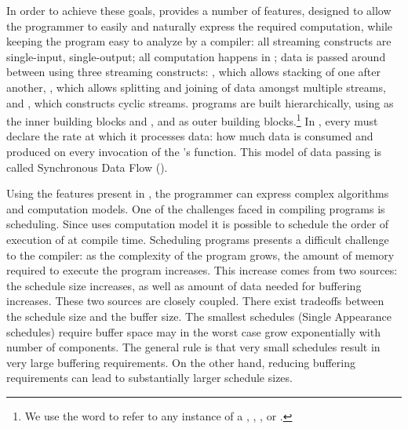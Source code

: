 In order to achieve these goals, {\StreamIt} provides a number of
features, designed to allow the programmer to easily and naturally
express the required computation, while keeping the program easy
to analyze by a compiler: all {\StreamIt} streaming constructs are
single-input, single-output; all computation happens in
{\filters}; data is passed around between {\filters} using three
streaming constructs: {\pipeline}, which allows stacking of
{\filters} one after another, {\splitjoin}, which allows splitting
and joining of data amongst multiple streams, and
{\feedbackloop}, which constructs cyclic streams. {\StreamIt}
programs are built hierarchically, using {\filters} as the inner
building blocks and {\pipelines}, {\splitjoins} and
{\feedbackloops} as outer building blocks.\footnote{We use the
word {\stream} to refer to any instance of a {\filter},
{\pipeline}, {\splitjoin}, or {\feedbackloop}.} In {\StreamIt},
every {\filter} must declare the rate at which it processes data:
how much data is consumed and produced on every invocation of the
{\filter}'s {\work} function. This model of data passing is called
Synchronous Data Flow ({\SDF}).

\begin{comment}
In addition to {\SDF}, {\StreamIt} allows the programmer to pass
data between {\filters} in an asynchronous manner, similar to a
combination of message passing and function calls. Timing of such
data delivery is expressed in terms of amount of information
wavefronts - the programmer can specify a delay between message
delivery and destination {\filter}'s processing of data currently
being produced or consumed by the source {\filter}.  Such timing
mechanism introduces latency and buffering constraints on
execution of {\StreamIt} programs.
\end{comment}

Using the features present in {\StreamIt}, the programmer can
express complex algorithms and computation models.  One of the
challenges faced in compiling {\StreamIt} programs is scheduling.
Since {\StreamIt} uses {\SDF} computation model it is possible to
schedule the order of execution of {\filters} at compile time.
Scheduling {\SDF} programs presents a difficult challenge to the
compiler:  as the complexity of the program grows, the amount of
memory required to execute the program increases.  This increase
comes from two sources: the schedule size increases, as well as
amount of data needed for buffering increases.  These two sources
are closely coupled. There exist tradeoffs between the schedule
size and the buffer size. The smallest schedules (Single
Appearance schedules) require buffer space may in the worst case
grow exponentially with number of components. The general rule is
that very small schedules result in very large buffering
requirements. On the other hand, reducing buffering requirements
can lead to substantially larger schedule sizes.

